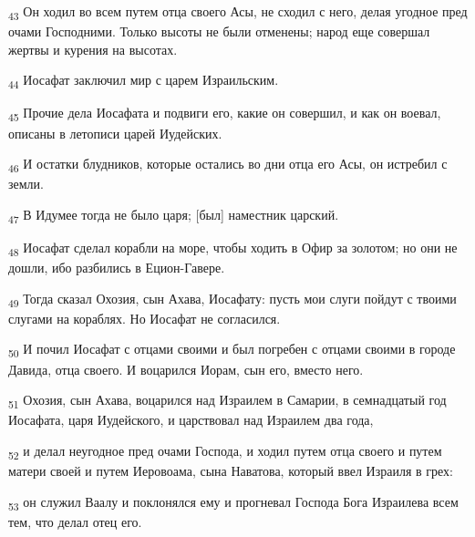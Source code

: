 \begin{tcolorbox}
\textsubscript{43} Он ходил во всем путем отца своего Асы, не сходил с него, делая угодное пред очами Господними. Только высоты не были отменены; народ еще совершал жертвы и курения на высотах.
\end{tcolorbox}
\begin{tcolorbox}
\textsubscript{44} Иосафат заключил мир с царем Израильским.
\end{tcolorbox}
\begin{tcolorbox}
\textsubscript{45} Прочие дела Иосафата и подвиги его, какие он совершил, и как он воевал, описаны в летописи царей Иудейских.
\end{tcolorbox}
\begin{tcolorbox}
\textsubscript{46} И остатки блудников, которые остались во дни отца его Асы, он истребил с земли.
\end{tcolorbox}
\begin{tcolorbox}
\textsubscript{47} В Идумее тогда не было царя; [был] наместник царский.
\end{tcolorbox}
\begin{tcolorbox}
\textsubscript{48} Иосафат сделал корабли на море, чтобы ходить в Офир за золотом; но они не дошли, ибо разбились в Ецион-Гавере.
\end{tcolorbox}
\begin{tcolorbox}
\textsubscript{49} Тогда сказал Охозия, сын Ахава, Иосафату: пусть мои слуги пойдут с твоими слугами на кораблях. Но Иосафат не согласился.
\end{tcolorbox}
\begin{tcolorbox}
\textsubscript{50} И почил Иосафат с отцами своими и был погребен с отцами своими в городе Давида, отца своего. И воцарился Иорам, сын его, вместо него.
\end{tcolorbox}
\begin{tcolorbox}
\textsubscript{51} Охозия, сын Ахава, воцарился над Израилем в Самарии, в семнадцатый год Иосафата, царя Иудейского, и царствовал над Израилем два года,
\end{tcolorbox}
\begin{tcolorbox}
\textsubscript{52} и делал неугодное пред очами Господа, и ходил путем отца своего и путем матери своей и путем Иеровоама, сына Наватова, который ввел Израиля в грех:
\end{tcolorbox}
\begin{tcolorbox}
\textsubscript{53} он служил Ваалу и поклонялся ему и прогневал Господа Бога Израилева всем тем, что делал отец его.
\end{tcolorbox}
